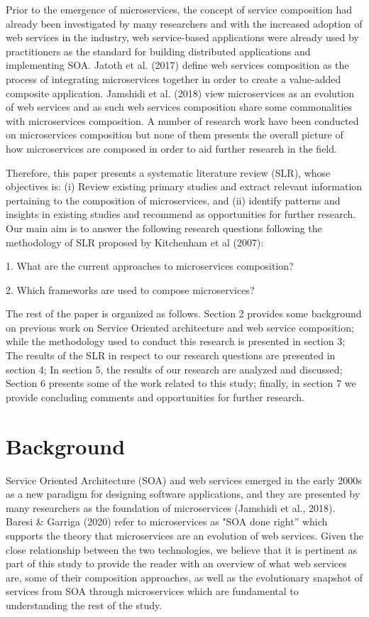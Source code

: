 \documentclass{article}
\begin{document}
\begin{multicols}{2}
Prior to the emergence of microservices, the concept of service composition had already been investigated by many researchers and with the increased adoption of web services in the industry, web service-based applications were already used by practitioners as the standard for building distributed applications and implementing SOA. Jatoth et al. (2017) define web services composition as the process of integrating microservices together in order to create a value-added composite application. Jamshidi et al. (2018) view microservices as an evolution of web services and as such web services composition share some commonalities with microservices composition. A number of research work have been conducted on microservices composition but none of them presents the overall picture of how microservices are composed in order to aid further research in the field. 

Therefore, this paper presents a systematic literature review (SLR), whose objectives is: (i) Review existing primary studies and extract relevant information pertaining to the composition of microservices, and (ii) identify patterns and insights in existing studies and recommend as opportunities for further research. Our main aim is to answer the following research questions following the methodology of SLR proposed by Kitchenham et al (2007):

1.	What are the current approaches to microservices composition?

2.	Which frameworks are used to compose microservices?

The rest of the paper is organized as follows. Section 2 provides some background on previous work on Service Oriented architecture and web service composition; while the methodology used to conduct this research is presented in section 3; The results of the SLR in respect to our research questions are presented in section 4; In section 5, the results of our research are analyzed and discussed; Section 6 presents some of the work related to this study; finally, in section 7 we provide concluding comments and opportunities for further research.


\section{Background}
Service Oriented Architecture (SOA) and web services emerged in the early 2000s as a new paradigm for designing software applications, and they are presented by many researchers as the foundation of microservices (Jamshidi et al., 2018). Baresi \& Garriga (2020) refer to microservices as "SOA done right” which supports the theory that microservices are an evolution of web services. Given the close relationship between the two technologies, we believe that it is pertinent as part of this study to provide the reader with an overview of what web services are, some of their composition approaches, as well as the evolutionary snapshot of services from SOA through microservices which are fundamental to understanding the rest of the study.


\end{multicols}
\end{document}
